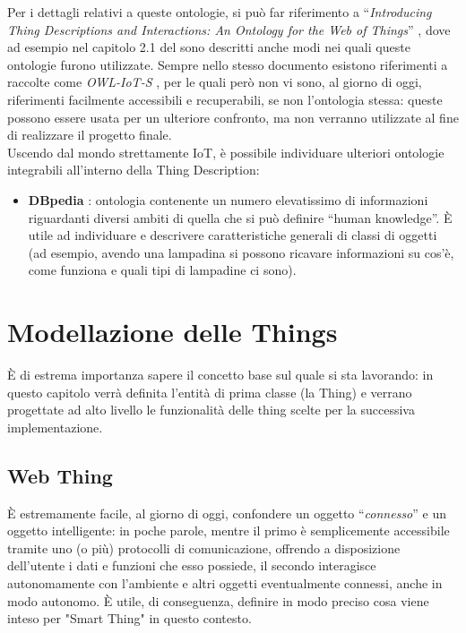 \documentclass[12pt,a4paper,openright,oneside]{report}
\newcommand{\quotes}[1]{``#1''}
\begin{document}
Per i dettagli relativi a queste ontologie, si può far riferimento a  \quotes{\textit{Introducing Thing Descriptions and Interactions: An Ontology for the Web of Things}} \cite{td-paper2}, dove ad esempio nel capitolo 2.1 del sono descritti anche modi nei quali queste ontologie furono utilizzate. Sempre nello stesso documento esistono riferimenti a raccolte come \textit{OWL-IoT-S} \cite{owliot}, per le quali però non vi sono, al giorno di oggi, riferimenti facilmente accessibili e recuperabili, se non l'ontologia stessa: queste possono essere usata per un ulteriore confronto, ma non verranno utilizzate al fine di realizzare il progetto finale.\\

Uscendo dal mondo strettamente IoT, è possibile individuare ulteriori ontologie integrabili all'interno della Thing Description:
\begin{itemize}
	\item \textbf{DBpedia} \cite{dbpedia}: ontologia contenente un numero elevatissimo di informazioni riguardanti diversi ambiti di quella che si può definire \quotes{human knowledge}. È utile ad individuare e descrivere caratteristiche generali di classi di oggetti (ad esempio, avendo una lampadina si possono ricavare informazioni su cos'è, come funziona e quali tipi di lampadine ci sono).
\end{itemize}








\clearpage{\pagestyle{empty}\cleardoublepage}
\chapter{Modellazione delle Things}           %
\lhead[\fancyplain{}{\bfseries\thepage}]{\fancyplain{}{\bfseries\rightmark}}  

È di estrema importanza sapere il concetto base sul quale si sta lavorando: in questo capitolo verrà definita l'entità di prima classe (la Thing) e verrano progettate ad alto livello le funzionalità delle thing scelte per la successiva implementazione.


\section{Web Thing}
\label{sec:webthing}
È estremamente facile, al giorno di oggi, confondere un oggetto \quotes{\textit{connesso}} e un oggetto intelligente: in poche parole, mentre il primo è semplicemente accessibile tramite uno (o più) protocolli di comunicazione, offrendo a disposizione dell'utente i dati e funzioni che esso possiede, il secondo interagisce autonomamente con l'ambiente e altri oggetti eventualmente connessi, anche in modo autonomo. È utile, di conseguenza, definire in modo preciso cosa viene inteso per "Smart Thing" in questo contesto.\\
\end{document}

